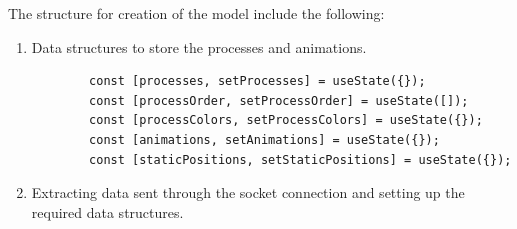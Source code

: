 \documentclass[12pt]{article}
\begin{document}
The structure for creation of the model include the following:
\begin{enumerate}
    \item Data structures to store the processes and animations.
    \begin{verbatim}
        const [processes, setProcesses] = useState({});
        const [processOrder, setProcessOrder] = useState([]); 
        const [processColors, setProcessColors] = useState({});
        const [animations, setAnimations] = useState({});
        const [staticPositions, setStaticPositions] = useState({});
    \end{verbatim}
    \item Extracting data sent through the socket connection and setting up the required data structures. 




            



\end{enumerate}
\end{document}
